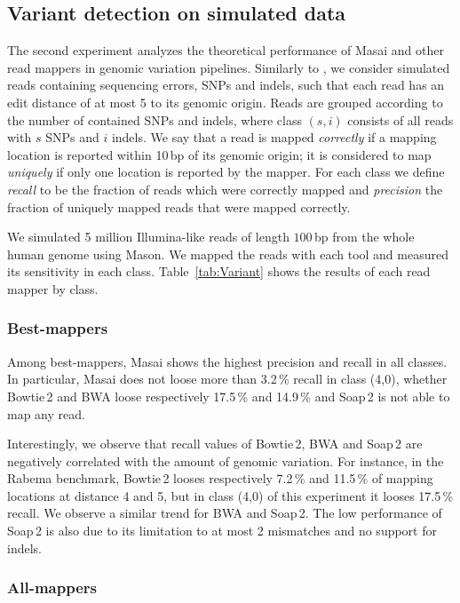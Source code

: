 \subsection{Variant detection on simulated data}

The second experiment analyzes the theoretical performance of Masai and other read mappers in genomic variation pipelines.
Similarly to \citep{Shrimp2}, we consider simulated reads containing sequencing errors, SNPs and indels, such that each read has an edit distance of at most 5 to its genomic origin.
Reads are grouped according to the number of contained SNPs and indels, where class $(s,i)$ consists of all reads with $s$ SNPs and $i$ indels.
We say that a read is mapped \emph{correctly} if a mapping location is reported within 10\,bp of its genomic origin;
it is considered to map \emph{uniquely} if only one location is reported by the mapper.
For each class we define \emph{recall} to be the fraction of reads which were correctly mapped and \emph{precision} the fraction of uniquely mapped reads that were mapped correctly.

We simulated 5 million Illumina-like reads of length $100$\,bp from the whole human genome using Mason.
We mapped the reads with each tool and measured its sensitivity in each class.
Table~\ref{tab:Variant} shows the results of each read mapper by class.

\subsubsection{Best-mappers}

Among best-mappers, Masai shows the highest precision and recall in all classes.
In particular, Masai does not loose more than 3.2\,\% recall in class (4,0), whether Bowtie\,2 and BWA loose respectively 17.5\,\% and 14.9\,\% and Soap\,2 is not able to map any read.

Interestingly, we observe that recall values of Bowtie\,2, BWA and Soap\,2 are negatively correlated with the amount of genomic variation.
For instance, in the Rabema benchmark, Bowtie\,2 looses respectively 7.2\,\% and 11.5\,\% of mapping locations at distance 4 and 5, but in class (4,0) of this experiment it looses 17.5\,\% recall.
We observe a similar trend for BWA and Soap\,2.
The low performance of Soap\,2 is also due to its limitation to at most 2 mismatches and no support for indels.

\subsubsection{All-mappers}

